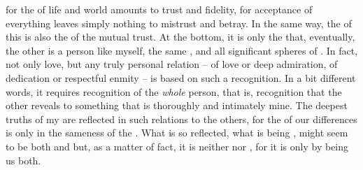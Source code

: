  for the  of life and world amounts to trust and
fidelity, for acceptance of everything leaves simply nothing to mistrust and
betray. In the same way, the  of this  is also the
 of the mutual trust. At the bottom, it is only the
 that, eventually, the other is a person like myself,
 the same ,  and all significant spheres of
.   In fact, not only love, but
any truly personal relation -- of love or deep admiration, of dedication or
respectful enmity -- is based on such a recognition. In a bit different words,
it requires recognition of the {\em whole} person, that is, recognition that the
other reveals to  something that is thoroughly and intimately {mine}.
The deepest truths of my  are reflected in such
relations to the others, for the  of our differences is
 only in the sameness of the .  What is so
reflected, what is being , might seem to be both  and
 but, as a matter of fact, it is neither  nor , for
it is  only by being  us both.

